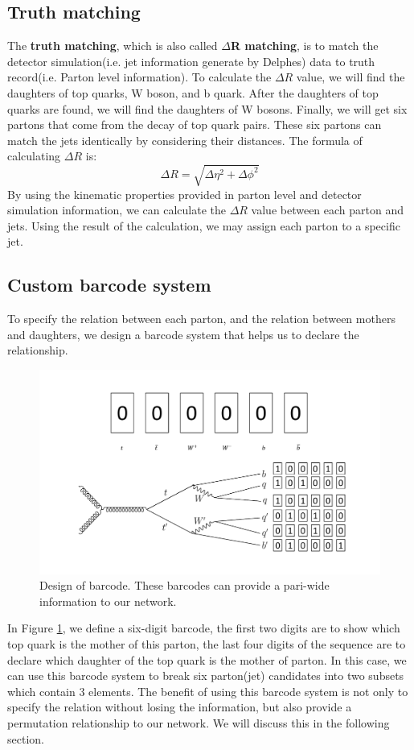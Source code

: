 \subsection{Truth matching}\label{subsec:Truth matching}
The \textbf{truth matching}, which is also called \textbf{$\Delta$R matching},  is to match the detector simulation(i.e. jet information generate by Delphes) data to truth record(i.e. Parton level information).  To calculate the $\Delta R$ value, we will find the daughters of top quarks, W boson, and b quark. After the daughters of top quarks are found, we will find the daughters of W bosons. Finally, we will get six partons that come from the decay of top quark pairs. These six partons can match the jets identically by considering their distances. The formula of calculating $\Delta R$ is:
\\
\begin{equation}
	\Delta R = \sqrt{\Delta\eta^{2} + \Delta\phi^{2}}
\end{equation}
By using the kinematic properties provided in parton level and detector simulation information, we can calculate the $\Delta R$ value between each parton and jets. Using the result of the calculation, we may assign each parton to a specific jet. 
\\
\subsection{Custom barcode system}\label{subsec:barcode}
To specify the relation between each parton, and the relation between mothers and daughters, we design a barcode system that helps us to declare the relationship.
\begin{figure}[H]
	\centering
	\includegraphics[width=1.1\linewidth]{Figures/barcode.pdf}
	\caption{Design of barcode. These barcodes can provide a pari-wide information to our network.}
	\label{fig:barcode}
\end{figure}
\newpage
In Figure \ref{fig:barcode}, we define a six-digit barcode, the first two digits are to show which top quark is the mother of this parton, the last four digits of the sequence are to declare which daughter of the top quark is the mother of parton. In this case, we can use this barcode system to break six parton(jet) candidates into two subsets which contain 3 elements. The benefit of using this barcode system is not only to specify the relation without losing the information, but also provide a permutation relationship to our network. We will discuss this in the following section.
